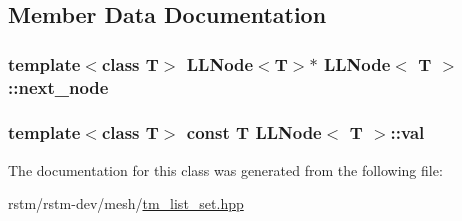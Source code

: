 \subsection{Member Data Documentation}
\hypertarget{classLLNode_a62d7ac55016f8831538563aaaf86e140}{
\subsubsection[{next\-\_\-node}]{\setlength{\rightskip}{0pt plus 5cm}template$<$class T$>$ {\bf L\-L\-Node}$<$T$>$$\ast$ {\bf L\-L\-Node}$<$ T $>$\-::next\-\_\-node\hspace{0.3cm}{\ttfamily [private]}}}\label{classLLNode_a62d7ac55016f8831538563aaaf86e140}
\hypertarget{classLLNode_ae57852f5450e75c2d65fb91833fff950}{
\subsubsection[{val}]{\setlength{\rightskip}{0pt plus 5cm}template$<$class T$>$ const T {\bf L\-L\-Node}$<$ T $>$\-::val\hspace{0.3cm}{\ttfamily [private]}}}\label{classLLNode_ae57852f5450e75c2d65fb91833fff950}


The documentation for this class was generated from the following file\-:\begin{DoxyCompactItemize}
\item 
rstm/rstm-\/dev/mesh/\hyperlink{tm__list__set_8hpp}{tm\-\_\-list\-\_\-set.\-hpp}\end{DoxyCompactItemize}
